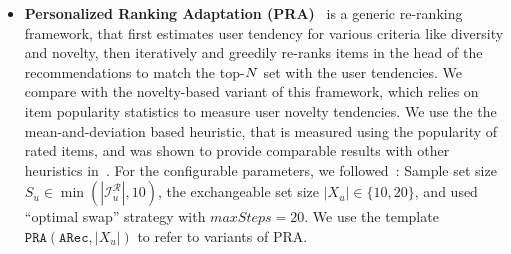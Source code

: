\begin{itemize}
\item \textbf{Personalized Ranking Adaptation (PRA)}~\cite{jugovac2017efficient} is  a generic re-ranking framework, that first estimates user tendency for various criteria like diversity and novelty, then  iteratively and greedily re-ranks  items in the head of the recommendations  to match the top-$N$ set  with the user tendencies. We compare with the novelty-based variant of this framework, which relies  on item popularity statistics  to measure   user novelty tendencies. We use the  the mean-and-deviation based heuristic, that  is measured using the popularity of rated items, and was shown to provide comparable results with other heuristics in~\cite{jugovac2017efficient}.  For the configurable parameters, we followed~\cite{jugovac2017efficient}: Sample set size $S_u \in \min(|\mathcal{I}^{\mathcal{R}}_u|,10)$,  the exchangeable set size $|X_u| \in \{10,20\}$, and used ``optimal swap'' strategy with $maxSteps=20$. We use the  template $\texttt{PRA}(\texttt{ARec}, |X_u|)$ to refer to variants of PRA.
\end{itemize}

